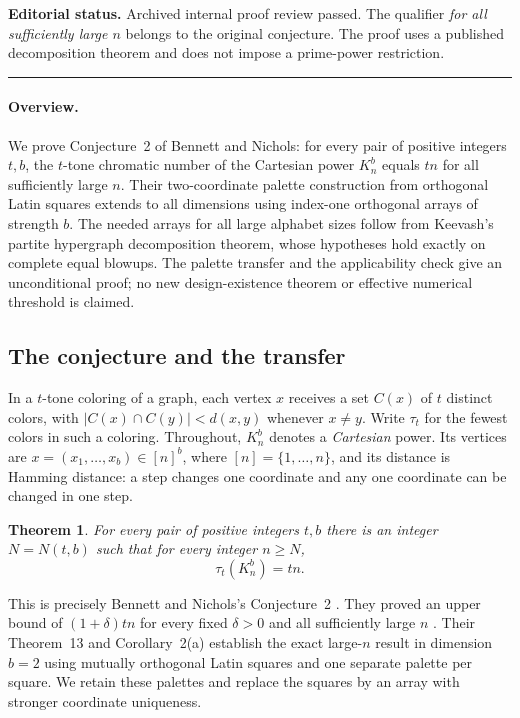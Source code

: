 \documentclass[11pt,a4paper]{article}
\newtheorem{SourceRbdTtheorem}{Theorem}
\begin{document}
\noindent\textbf{Editorial status.} Archived internal proof review passed. The qualifier \emph{for all sufficiently large $n$} belongs to the original conjecture. The proof uses a published decomposition theorem and does not impose a prime-power restriction.

\smallskip\hrule\medskip



\begingroup

\setcounter{equation}{0}
\renewcommand{\theequation}{\thesection.\arabic{equation}}
\renewcommand{\theHequation}{R13T.\arabic{equation}}
\paragraph{Overview.}
We prove Conjecture~2 of Bennett and Nichols: for every pair of positive integers $t,b$, the $t$-tone chromatic number of the Cartesian power $K_n^b$ equals $tn$ for all sufficiently large $n$. Their two-coordinate palette construction from orthogonal Latin squares extends to all dimensions using index-one orthogonal arrays of strength $b$. The needed arrays for all large alphabet sizes follow from Keevash's partite hypergraph decomposition theorem, whose hypotheses hold exactly on complete equal blowups. The palette transfer and the applicability check give an unconditional proof; no new design-existence theorem or effective numerical threshold is claimed.


\subsection{The conjecture and the transfer}
In a $t$-tone coloring of a graph, each vertex $x$ receives a set $C(x)$ of $t$ distinct colors, with $|C(x)\cap C(y)|<d(x,y)$ whenever $x\ne y$. Write $\tau_t$ for the fewest colors in such a coloring. Throughout, $K_n^b$ denotes a \emph{Cartesian} power. Its vertices are $x=(x_1,\ldots,x_b)\in[n]^b$, where $[n]=\{1,\ldots,n\}$, and its distance is Hamming distance: a step changes one coordinate and any one coordinate can be changed in one step.

\begin{SourceRbdTtheorem}\label{R13T:main}
For every pair of positive integers $t,b$ there is an integer $N=N(t,b)$ such that for every integer $n\ge N$,
\[
\tau_t(K_n^b)=tn.
\]
\end{SourceRbdTtheorem}
This is precisely Bennett and Nichols's Conjecture~2 \cite[\S8]{R13T:BN}. They proved an upper bound of $(1+\delta)tn$ for every fixed $\delta>0$ and all sufficiently large $n$ \cite[Theorem~12]{R13T:BN}. Their Theorem~13 and Corollary~2(a) establish the exact large-$n$ result in dimension $b=2$ using mutually orthogonal Latin squares and one separate palette per square. We retain these palettes and replace the squares by an array with stronger coordinate uniqueness.
\end{document}
